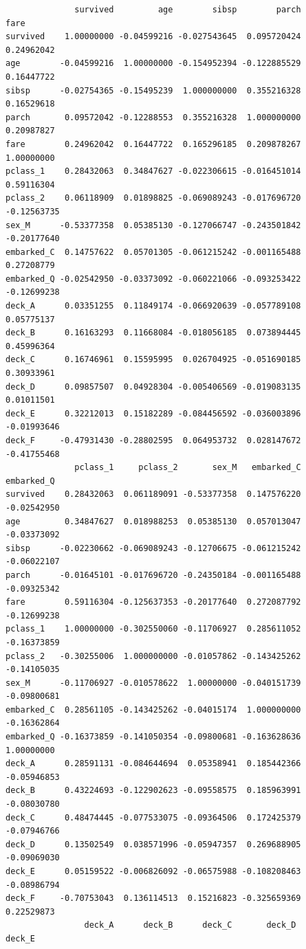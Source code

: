 \documentclass[
  letterpaper,
  DIV=11,
  numbers=noendperiod]{scrartcl}
\begin{document}
\begin{verbatim}
              survived         age        sibsp        parch        fare
survived    1.00000000 -0.04599216 -0.027543645  0.095720424  0.24962042
age        -0.04599216  1.00000000 -0.154952394 -0.122885529  0.16447722
sibsp      -0.02754365 -0.15495239  1.000000000  0.355216328  0.16529618
parch       0.09572042 -0.12288553  0.355216328  1.000000000  0.20987827
fare        0.24962042  0.16447722  0.165296185  0.209878267  1.00000000
pclass_1    0.28432063  0.34847627 -0.022306615 -0.016451014  0.59116304
pclass_2    0.06118909  0.01898825 -0.069089243 -0.017696720 -0.12563735
sex_M      -0.53377358  0.05385130 -0.127066747 -0.243501842 -0.20177640
embarked_C  0.14757622  0.05701305 -0.061215242 -0.001165488  0.27208779
embarked_Q -0.02542950 -0.03373092 -0.060221066 -0.093253422 -0.12699238
deck_A      0.03351255  0.11849174 -0.066920639 -0.057789108  0.05775137
deck_B      0.16163293  0.11668084 -0.018056185  0.073894445  0.45996364
deck_C      0.16746961  0.15595995  0.026704925 -0.051690185  0.30933961
deck_D      0.09857507  0.04928304 -0.005406569 -0.019083135  0.01011501
deck_E      0.32212013  0.15182289 -0.084456592 -0.036003896 -0.01993646
deck_F     -0.47931430 -0.28802595  0.064953732  0.028147672 -0.41755468
              pclass_1     pclass_2       sex_M   embarked_C  embarked_Q
survived    0.28432063  0.061189091 -0.53377358  0.147576220 -0.02542950
age         0.34847627  0.018988253  0.05385130  0.057013047 -0.03373092
sibsp      -0.02230662 -0.069089243 -0.12706675 -0.061215242 -0.06022107
parch      -0.01645101 -0.017696720 -0.24350184 -0.001165488 -0.09325342
fare        0.59116304 -0.125637353 -0.20177640  0.272087792 -0.12699238
pclass_1    1.00000000 -0.302550060 -0.11706927  0.285611052 -0.16373859
pclass_2   -0.30255006  1.000000000 -0.01057862 -0.143425262 -0.14105035
sex_M      -0.11706927 -0.010578622  1.00000000 -0.040151739 -0.09800681
embarked_C  0.28561105 -0.143425262 -0.04015174  1.000000000 -0.16362864
embarked_Q -0.16373859 -0.141050354 -0.09800681 -0.163628636  1.00000000
deck_A      0.28591131 -0.084644694  0.05358941  0.185442366 -0.05946853
deck_B      0.43224693 -0.122902623 -0.09558575  0.185963991 -0.08030780
deck_C      0.48474445 -0.077533075 -0.09364506  0.172425379 -0.07946766
deck_D      0.13502549  0.038571996 -0.05947357  0.269688905 -0.09069030
deck_E      0.05159522 -0.006826092 -0.06575988 -0.108208463 -0.08986794
deck_F     -0.70753043  0.136114513  0.15216823 -0.325659369  0.22529873
                deck_A      deck_B      deck_C       deck_D       deck_E

\end{verbatim}
\end{document}

